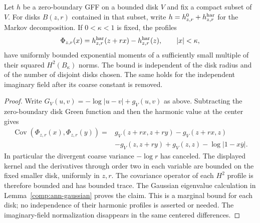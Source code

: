 \begin{lemma}
\label{common:disk-profiles}
Let $h$ be a zero-boundary GFF on a bounded disk $V$ and fix a compact
subset of $V$.  For disks $B(z,r)$ contained in that subset, write
$h=h_{z,r}^0+h_{z,r}^{\rm har}$ for the Markov decomposition.  If
$0<\kappa<1$ is fixed, the profiles
\[
 \Phi_{z,r}(x)=h_{z,r}^{\rm har}(z+rx)-h_{z,r}^{\rm har}(z),
 \qquad |x|<\kappa,
\]
have uniformly bounded exponential moments of a sufficiently small
multiple of their squared $H^2(B_\kappa)$ norms.  The bound is independent
of the disk radius and of the number of disjoint disks chosen.  The same
holds for the independent imaginary field after its coarse constant is
removed.
\end{lemma}
\begin{proof}
Write $G_V(u,v)=-\log|u-v|+g_V(u,v)$ as above.  Subtracting the
zero-boundary disk Green function and then the harmonic value at the
center gives
\[
\begin{aligned}
 \operatorname{Cov}(\Phi_{z,r}(x),\Phi_{z,r}(y))
 ={}&g_V(z+rx,z+ry)-g_V(z+rx,z)\\
 &-g_V(z,z+ry)+g_V(z,z)-\log|1-x\overline y|.
\end{aligned}
\]
In particular the divergent coarse variance $-\log r$ has canceled.
The displayed kernel and the derivatives through order two in each
variable are bounded on the fixed smaller disk, uniformly in $z,r$.
The covariance operator of each $H^2$ profile is therefore bounded and
has bounded trace.  The Gaussian eigenvalue calculation in
Lemma~\ref{comp:ann-gaussian} proves the claim.  This is a marginal
bound for each disk; no independence of their harmonic profiles is
asserted or needed.  The imaginary-field normalization disappears in
the same centered differences.
\end{proof}

